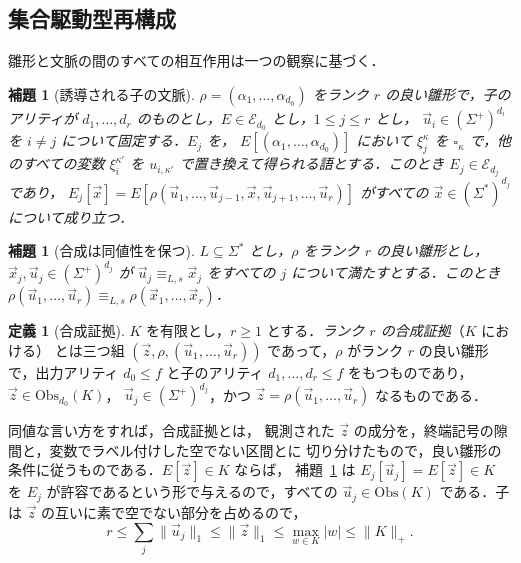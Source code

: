\documentclass[11pt,a4paper]{ltjsarticle}
\numberwithin{equation}{section}
\theoremstyle{plain}
\newtheorem{lemma}[theorem]{補題}
\theoremstyle{definition}
\newtheorem{definition}[theorem]{定義}
\theoremstyle{remark}
\newcommand{\tuple}[1]{\vec{#1}}
\newcommand{\blank}{\square}
\theoremstyle{plain}
\begin{document}
\subsection{集合駆動型再構成}

雛形と文脈の間のすべての相互作用は一つの観察に基づく．

\begin{lemma}[誘導される子の文脈]
\label{lem:filling-identity}
$\rho=(\alpha_1,\ldots,\alpha_{d_0})$ をランク $r$ の良い雛形で，子の
アリティが $d_1,\ldots,d_r$ のものとし，$E\in\mathcal E_{d_0}$ とし，$1\le j\le r$ とし，
$\tuple u_i\in(\Sigma^+)^{d_i}$ を $i\ne j$ について固定する．$E_j$ を，
$E[(\alpha_1,\ldots,\alpha_{d_0})]$ において $\xi_j^\kappa$ を
$\blank_\kappa$ で，他のすべての変数 $\xi_i^{\kappa'}$ を $u_{i,\kappa'}$ で置き換えて得られる語とする．このとき
$E_j\in\mathcal E_{d_j}$ であり，
$E_j[\tuple x]=E[\rho(\tuple u_1,\ldots,\tuple u_{j-1},\tuple x,
\tuple u_{j+1},\ldots,\tuple u_r)]$ がすべての
$\tuple x\in(\Sigma^*)^{d_j}$ について成り立つ．
\end{lemma}


\begin{lemma}[合成は同値性を保つ]
\label{lem:witnessed-composition}
$L\subseteq\Sigma^*$ とし，$\rho$ をランク $r$ の良い雛形とし，
$\tuple x_j,\tuple u_j\in(\Sigma^+)^{d_j}$ が
$\tuple u_j\equiv_{L,s}\tuple x_j$ をすべての $j$ について満たすとする．このとき
$\rho(\tuple u_1,\ldots,\tuple u_r)\equiv_{L,s}\rho(\tuple x_1,\ldots,\tuple x_r)$．
\end{lemma}

\begin{definition}[合成証拠]
\label{def:composition-witness}
$K$ を有限とし，$r\ge1$ とする．\emph{ランク $r$ の合成証拠}（$K$ における）
とは三つ組 $(\tuple z,\rho,(\tuple u_1,\ldots,\tuple u_r))$ であって，$\rho$
がランク $r$ の良い雛形で，出力アリティ $d_0\le f$ と子のアリティ
$d_1,\ldots,d_r\le f$ をもつものであり，$\tuple z\in\mathrm{Obs}_{d_0}(K)$，
$\tuple u_j\in(\Sigma^+)^{d_j}$，かつ
$\tuple z=\rho(\tuple u_1,\ldots,\tuple u_r)$ なるものである．
\end{definition}

同値な言い方をすれば，合成証拠とは，
観測された $\tuple z$ の成分を，終端記号の隙間と，変数でラベル付けした空でない区間とに
切り分けたもので，良い雛形の条件に従うものである．$E[\tuple z]\in K$ ならば，
補題~\ref{lem:filling-identity} は $E_j[\tuple u_j]=E[\tuple z]\in K$ を
$E_j$ が許容であるという形で与えるので，すべての $\tuple u_j\in\mathrm{Obs}(K)$ である．子は
$\tuple z$ の互いに素で空でない部分を占めるので，
\begin{equation}
\label{eq:sample-rank}
 r\le\textstyle\sum_j\|\tuple u_j\|_1\le\|\tuple z\|_1\le\max_{w\in K}|w|
 \le\|K\|_+ .
\end{equation}
\end{document}
